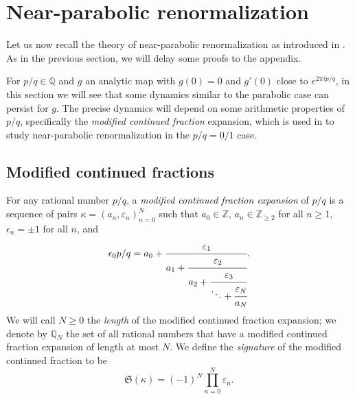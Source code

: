 \documentclass[12pt,letterpaper]{amsart}
\numberwithin{equation}{section}
\theoremstyle{remark}
\theoremstyle{definition}
\newcommand{\C}{\mathbb C}
\newcommand{\Q}{\mathbb Q}
\newcommand{\Z}{\mathbb Z}
\newcommand{\RR}{\mathcal R}
\DeclareMathOperator{\Dom}{Dom}
\DeclareMathOperator{\Exp}{Exp}
\begin{document}
	\begin{center}	
	\end{center}
	
	

	
	
	\section{Near-parabolic renormalization}\label{sec:near-parabolic}
	
	Let us now recall the theory of near-parabolic renormalization as introduced in \cite{shishikura_1}.
	As in the previous section, we will  delay some proofs to the  appendix.
	
	
	
	For $p/q\in \Q$ and $g$ an analytic map with $g(0) =0$ and $g'(0)$ close to $e^{2\pi i p/q}$, in this section we will see that some dynamics similar to the parabolic case can persist for $g$. 
	The precise dynamics will depend on  some arithmetic properties of $p/q$, specifically the \textit{modified continued fraction} expansion, which is used in  \cite{shishikura}
	to study near-parabolic renormalization in the $p/q=0/1$ case. 
	
	\subsection{Modified continued fractions}	
	For any rational number $p/q$, a \textit{modified continued fraction expansion} of $p/q$ is a sequence of pairs $\kappa = ( a_n, \varepsilon_n)_{n=0}^N$ such that 
	$a_0\in \Z$,  $a_n\in \Z_{\geq 2}$ for all $n\geq 1$, $\epsilon_n=\pm 1$ for all $n$, and 
	\begin{equation*}
		\epsilon_0p/q=  a_0+\cfrac{\varepsilon_1}{a_1+\cfrac{\varepsilon_2}{a_2+\cfrac{\varepsilon_3}{\ddots+\cfrac{\varepsilon_N}{a_N}}}}.
	\end{equation*}
	We will call $N\geq 0$ the \textit{length} of the modified continued fraction expansion; we denote by $\Q_N$ the set of all rational numbers that have a modified continued fraction expansion of length at most $N$.
	We define the \textit{signature} of the modified continued fraction to be 
	$$\mathfrak{S}(\kappa) = (-1)^N\prod_{n=0}^N\varepsilon_n.$$
	
\end{document}
